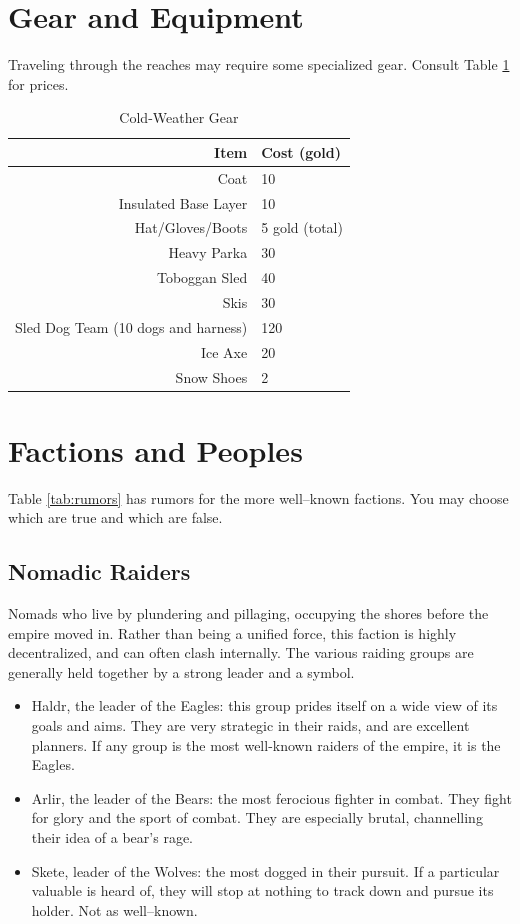 \documentclass[notitlepage]{article}
\begin{document}
\begin{multicols}{2}
\section{Gear and Equipment}

Traveling through the reaches may require some specialized gear.
Consult Table \ref{tab:gear} for prices.

\begin{table}[t]
  \centering
  \begin{tabular}{|r|l|} \hline
    Item & Cost (gold)  \\ \hline
    Coat & 10  \\
    Insulated Base Layer & 10 \\ 
    Hat/Gloves/Boots & 5 gold (total) \\
    Heavy Parka & 30 \\
    Toboggan Sled & 40 \\
    Skis & 30 \\
    Sled Dog Team (10 dogs and harness) & 120 \\
    Ice Axe & 20 \\
    Snow Shoes & 2 \\
 \hline \end{tabular}
  \caption{Cold-Weather Gear}
  \label{tab:gear}
\end{table}

  \section{Factions and Peoples}

  Table \ref{tab:rumors} has rumors for the more well--known factions.
  You may choose which are true and which are false.

  \subsection*{Nomadic Raiders}

  Nomads who live by plundering and pillaging, occupying the shores before the empire moved in.
  Rather than being a unified force, this faction is highly decentralized, and can often clash internally.
  The various raiding groups are generally held together by a strong leader and a symbol.

  \begin{itemize}
  \item Haldr, the leader of the Eagles: this group prides itself on a wide view of its goals and aims. They are very strategic in their raids, and are excellent planners. If any group is the most well-known raiders of the empire, it is the Eagles.
  \item Arlir, the leader of the Bears: the most ferocious fighter in combat. They fight for glory and the sport of combat. They are especially brutal, channelling their idea of a bear's rage.
  \item Skete, leader of the Wolves: the most dogged in their pursuit. If a particular valuable is heard of, they will stop at nothing to track down and pursue its holder. Not as well--known.
  \end{itemize}


\end{multicols}
\end{document}

